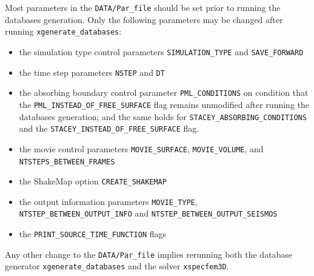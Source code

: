 \noindent
Most parameters in the \texttt{DATA/Par\_file} should be set prior to running
the databases generation. Only the following parameters may be changed
after running \texttt{xgenerate\_databases}:
\begin{itemize}
\item the simulation type control parameters \texttt{SIMULATION\_TYPE}
and \texttt{SAVE\_FORWARD}
\item the time step parameters \texttt{NSTEP} and \texttt{DT}
\item the absorbing boundary control parameter \texttt{PML\_CONDITIONS}
on condition that the\newline
 \texttt{PML\_INSTEAD\_OF\_FREE\_SURFACE} flag remains unmodified
after running the databases generation;
and the same holds for \texttt{STACEY\_ABSORBING\_CONDITIONS} and the \texttt{STACEY\_INSTEAD\_OF\_FREE\_SURFACE} flag.
\item the movie control parameters \texttt{MOVIE\_SURFACE}, \texttt{MOVIE\_VOLUME},
and \texttt{NTSTEPS\_BETWEEN\_FRAMES}
\item the ShakeMap\textregistered{} option \texttt{CREATE\_SHAKEMAP}
\item the output information parameters \texttt{MOVIE\_TYPE}, \texttt{NTSTEP\_BETWEEN\_OUTPUT\_INFO} and\newline
\texttt{NTSTEP\_BETWEEN\_OUTPUT\_SEISMOS}
\item the \texttt{PRINT\_SOURCE\_TIME\_FUNCTION} flags
\end{itemize}
Any other change to the \texttt{DATA/Par\_file} implies rerunning both
the database generator \texttt{xgenerate\_databases} and the solver
\texttt{xspecfem3D}.\newline


